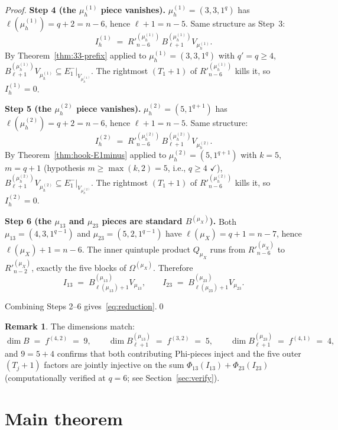 \documentclass[11pt]{article}
\theoremstyle{definition}
\newtheorem{remark}[theorem]{Remark}
\newcommand{\Om}{\Omega}
\newcommand{\Rp}{{R'}}
\begin{document}
\begin{proof}
\medskip\textbf{Step 4 (the $\mu_h^{(1)}$ piece vanishes).}
$\mu_h^{(1)} = (3, 3, 1^q)$ has $\ell(\mu_h^{(1)}) = q + 2 = n - 6$,
hence $\ell + 1 = n - 5$.  Same structure as Step~3:
\[
   I_h^{(1)} \;=\; \Rp_{n-6}^{(\mu_h^{(1)})}\,
   B^{(\mu_h^{(1)})}_{\ell+1} V_{\mu_h^{(1)}}.
\]
By Theorem~\ref{thm:33-prefix} applied to $\mu_h^{(1)} = (3, 3, 1^q)$
with $q' = q \ge 4$, $B^{(\mu_h^{(1)})}_{\ell+1} V_{\mu_h^{(1)}}
\subseteq E_1^-|_{V_{\mu_h^{(1)}}}$.  The rightmost $(T_1+1)$ of
$\Rp_{n-6}^{(\mu_h^{(1)})}$ kills it, so $I_h^{(1)} = 0$.

\medskip\textbf{Step 5 (the $\mu_h^{(2)}$ piece vanishes).}
$\mu_h^{(2)} = (5, 1^{q+1})$ has $\ell(\mu_h^{(2)}) = q + 2 = n - 6$,
hence $\ell + 1 = n - 5$.  Same structure:
\[
   I_h^{(2)} \;=\; \Rp_{n-6}^{(\mu_h^{(2)})}\,
   B^{(\mu_h^{(2)})}_{\ell+1} V_{\mu_h^{(2)}}.
\]
By Theorem~\ref{thm:hook-E1minus} applied to $\mu_h^{(2)} =
(5, 1^{q+1})$ with $k = 5$, $m = q + 1$ (hypothesis $m \ge \max(k, 2)
= 5$, i.e., $q \ge 4$ $\checkmark$), $B^{(\mu_h^{(2)})}_{\ell+1}
V_{\mu_h^{(2)}} \subseteq E_1^-|_{V_{\mu_h^{(2)}}}$.  The rightmost
$(T_1+1)$ of $\Rp_{n-6}^{(\mu_h^{(2)})}$ kills it, so $I_h^{(2)} = 0$.

\medskip\textbf{Step 6 (the $\mu_{13}$ and $\mu_{23}$ pieces are
standard $B^{(\mu_X)}$).}  Both $\mu_{13} = (4, 3, 1^{q-1})$ and
$\mu_{23} = (5, 2, 1^{q-1})$ have $\ell(\mu_X) = q + 1 = n - 7$, hence
$\ell(\mu_X) + 1 = n - 6$.  The inner quintuple product $Q_{\mu_X}$
runs from $\Rp^{(\mu_X)}_{n-6}$ to $\Rp^{(\mu_X)}_{n-2}$, exactly the
five blocks of $\Om^{(\mu_X)}$.  Therefore
\[
   I_{13} \;=\; B^{(\mu_{13})}_{\ell(\mu_{13})+1} V_{\mu_{13}},
   \qquad
   I_{23} \;=\; B^{(\mu_{23})}_{\ell(\mu_{23})+1} V_{\mu_{23}}.
\]

Combining Steps 2--6 gives~\eqref{eq:reduction}.\qed
\end{proof}

\begin{remark}\label{rem:dim-add}
The dimensions match:
\[
   \dim B \;=\; f^{(4, 2)} \;=\; 9,
   \qquad
   \dim B^{(\mu_{13})}_{\ell+1} \;=\; f^{(3, 2)} \;=\; 5,
   \qquad
   \dim B^{(\mu_{23})}_{\ell+1} \;=\; f^{(4, 1)} \;=\; 4,
\]
and $9 = 5 + 4$ confirms that both contributing Phi-pieces inject and
the five outer $(T_j+1)$ factors are jointly injective on the sum
$\Phi_{13}(I_{13}) + \Phi_{23}(I_{23})$ (computationally verified at
$q = 6$; see Section~\ref{sec:verify}).
\end{remark}

\section{Main theorem}\label{sec:main}
\end{document}
